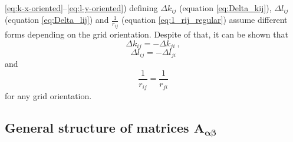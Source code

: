 \documentclass[manuscript]{geophysics}
\providecommand{\DIFaddtex}[1]{{\protect\color{blue}\uwave{#1}}} %
\providecommand{\DIFaddbegin}{} %
\providecommand{\DIFaddend}{} %
\providecommand{\DIFadd}[1]{\texorpdfstring{\DIFaddtex{#1}}{#1}} %
\begin{document}
	\ref{eq:k-x-oriented}--\ref{eq:l-y-oriented}) defining $\Delta k_{ij}$ (equation
	\ref{eq:Delta_kij}), $\Delta l_{ij}$ (equation \ref{eq:Delta_lij}) and 
	$\tfrac{1}{r_{ij}}$ (equation \ref{eq:1_rij_regular}) assume different 
	forms depending on the \DIFaddbegin \DIFadd{defined }\DIFaddend grid orientation.
	Despite of that, it can be shown that
	\begin{equation}
		\Delta k_{ij} = - \Delta k_{ji} \: ,
		\label{eq:Delta_kij_symmetry}
	\end{equation}
	\begin{equation}
		\Delta l_{ij} = - \Delta l_{ji}
		\label{eq:Delta_lij_symmetry}
	\end{equation}
	and 
	\begin{equation}
		\frac{1}{r_{ij}} = \frac{1}{r_{ji}}
		\label{eq:1_rij_symmetry}
	\end{equation}
	for any grid orientation.
	
	\subsection{General structure of matrices $\mathbf{A_{\boldsymbol{\alpha\beta}}}$}
	
\end{document}
